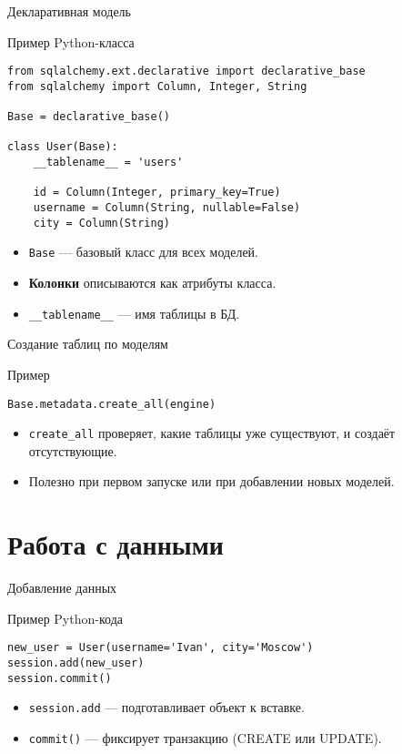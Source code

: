 \documentclass{beamer}
\begin{document}
\begin{frame}[fragile]{Декларативная модель}
	\begin{block}{Пример Python-класса}
		\begin{verbatim}
from sqlalchemy.ext.declarative import declarative_base
from sqlalchemy import Column, Integer, String

Base = declarative_base()

class User(Base):
    __tablename__ = 'users'

    id = Column(Integer, primary_key=True)
    username = Column(String, nullable=False)
    city = Column(String)
\end{verbatim}
	\end{block}

	\begin{itemize}
		\item \texttt{Base} — базовый класс для всех моделей.
		\item \textbf{Колонки} описываются как атрибуты класса.
		\item \texttt{\_\_tablename\_\_} — имя таблицы в БД.
	\end{itemize}
\end{frame}

\begin{frame}[fragile]{Создание таблиц по моделям}
	\begin{block}{Пример}
		\begin{verbatim}
Base.metadata.create_all(engine)
\end{verbatim}
	\end{block}

	\begin{itemize}
		\item \texttt{create\_all} проверяет, какие таблицы уже существуют, и создаёт отсутствующие.
		\item Полезно при первом запуске или при добавлении новых моделей.
	\end{itemize}
\end{frame}

\section{Работа с данными}

\begin{frame}[fragile]{Добавление данных}
	\begin{block}{Пример Python-кода}
		\begin{verbatim}
new_user = User(username='Ivan', city='Moscow')
session.add(new_user)
session.commit()
\end{verbatim}
	\end{block}

	\begin{itemize}
		\item \texttt{session.add} — подготавливает объект к вставке.
		\item \texttt{commit()} — фиксирует транзакцию (CREATE или UPDATE).
	\end{itemize}
\end{frame}
\end{document}
